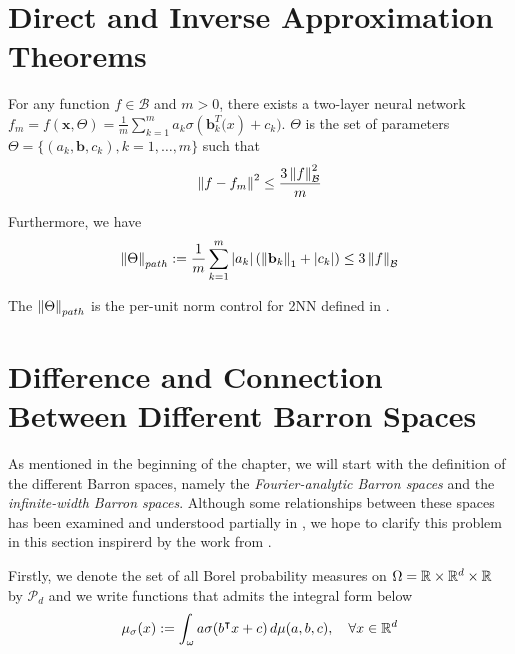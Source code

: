 \section{Direct and Inverse Approximation Theorems}

\begin{theorem} 
    For any function $f \in \mathcal{B}$ and $m > 0$, there exists a two-layer
    neural network $f_m = f(\mathbf{x}, \Theta) = \frac{1}{m}\sum_{k=1}^m a_k
        \sigma(\mathbf{b}_k^T \mathbf(x) + c_k)$. $\Theta$ is the set of parameters
    $\Theta = \{(a_k, \mathbf{b}, c_k), k=1,\dots,m\}$ such that
    \begin{equation*}
        \left\| f - f_m \right\|^2 \leq \frac{3\left\| f \right\|_{\mathcal{B}}^2}{m}
    \end{equation*}

    Furthermore, we have
    \begin{equation}
        \left\| \Theta \right\|_{path} := \frac{1}{m} \sum_{k=1}^m \left| a_k \right| (\left\| \mathbf{b}_k \right\|_1 + \left| c_k \right|)
        \leq 3\left\| f \right\|_{\mathcal{B}}
    \end{equation}
\end{theorem}

The $\left\| \Theta \right\|_{path}$ is the per-unit norm control for 2NN defined in
\cite{neyshaburNormBasedCapacityControl2015}. 

\section{Difference and Connection Between Different Barron Spaces}
\label{sec:diff_barron_spaces}


As mentioned in the beginning of the chapter, we will start with the definition
of the different Barron spaces, namely the \textit{Fourier-analytic Barron
spaces} and the \textit{infinite-width Barron spaces}. Although some
relationships between these spaces has been examined and understood partially in
\cite{eBarronSpaceFlowinduced2021,eMathematicalUnderstandingNeural2020}, we hope
to clarify this problem in this section inspirerd by the work from
\cite{carageaNeuralNetworkApproximation2022}.

Firstly, we denote the set of all Borel probability measures on $\Omega = \mathbb{R}
\times \mathbb{R}^d \times \mathbb{R}$ by $\mathcal{P}_d$ and we write functions that admits the
integral form below
\begin{equation}
    \mu_{\sigma}(x) := \int_{\omega} a\sigma(b{}^{\intercal} x + c) \,d\mu(a,b,c), \quad
    \forall x \in \mathbb{R}^d
\end{equation}

